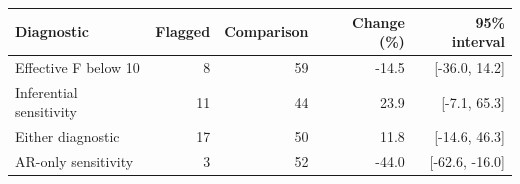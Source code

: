 \begin{tabular}{lrrrr}
\toprule
Diagnostic & Flagged & Comparison & Change (\%) & 95\% interval \\
\midrule
Effective F below 10 & 8 & 59 & -14.5 & [-36.0, 14.2] \\
Inferential sensitivity & 11 & 44 & 23.9 & [-7.1, 65.3] \\
Either diagnostic & 17 & 50 & 11.8 & [-14.6, 46.3] \\
AR-only sensitivity & 3 & 52 & -44.0 & [-62.6, -16.0] \\
\bottomrule
\end{tabular}
